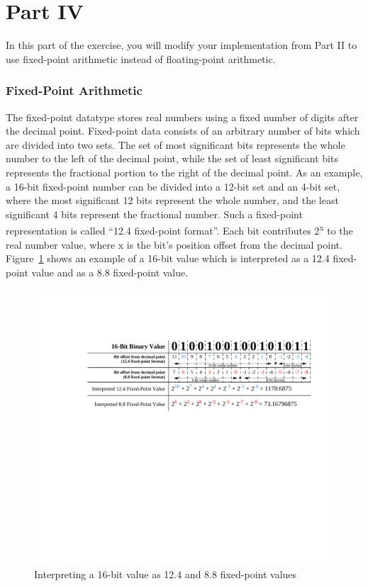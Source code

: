 \documentclass[epsfig,10pt,fullpage]{article}
\begin{document}
\section*{Part IV}

In this part of the exercise, you will modify your implementation from Part II to use fixed-point arithmetic instead of
floating-point arithmetic. 


\subsubsection*{Fixed-Point Arithmetic}

The fixed-point datatype stores real numbers using a fixed number of digits after the decimal point. 
Fixed-point data consists of an arbitrary number of bits which are divided into two sets. 
The set of most significant bits represents the whole number to the left of the decimal point,
while the set of least significant bits represents the fractional portion to the right of the decimal point.
As an example, a 16-bit fixed-point number can be divided into a 12-bit set and an 4-bit set, where the most
significant 12 bits represent the whole number, and the least significant 4 bits represent the fractional number. 
Such a fixed-point representation is called ``12.4 fixed-point format''.
Each bit contributes 2\textsuperscript{x} to the real number value, where x is the bit's position offset from the decimal point. 
Figure~\ref{fig:fixed_point} shows an example of a 16-bit value which is interpreted as a 12.4 fixed-point value and as a 8.8 fixed-point value.

\begin{figure}[H]
   \begin{center}
       \includegraphics[scale=0.70]{figures/fig_fixed_point}
   \end{center}
   \caption{Interpreting a 16-bit value as 12.4 and 8.8 fixed-point values}
	\label{fig:fixed_point}
\end{figure}
\end{document}
